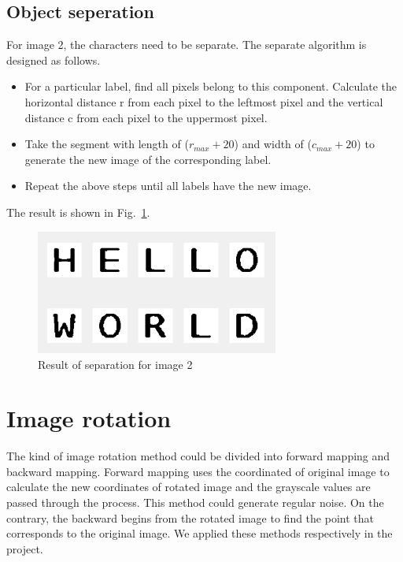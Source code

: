 \documentclass[hyperref]{article}
\theoremstyle{nonumberplain}
\begin{document}
	\subsection{Object seperation}
	
	\hspace{1.0em}
	For image 2, the characters need to be separate. The separate algorithm is designed as follows.
	
	\begin{itemize}
		\item[Step 1. ] For a particular label, find all pixels belong to this component. Calculate the horizontal distance r from each pixel to the leftmost pixel and the vertical distance c from each pixel to the uppermost pixel.
		\item[Step 2. ] Take the segment with length of ($r_{max}+20$) and width of ($c_{max}+20$) to generate the new image of the corresponding label.
		\item[Step 3. ] Repeat the above steps until all labels have the new image.
	\end{itemize}

	The result is shown in Fig.~\ref{fig19}.
	
		\begin{figure}[htbp]
		\centering
		\includegraphics[width=8cm]{result seperate.png}
		\caption{Result of separation for image 2}
		\label{fig19}
	\end{figure}
	
	
	\section{Image rotation}
	
	\hspace{1.0em}
	The kind of image rotation method could be divided into forward mapping and backward mapping. Forward mapping uses the coordinated of original image to calculate the new coordinates of rotated image and the grayscale values are passed through the process. This method could generate regular noise. On the contrary, the backward begins from the rotated image to find the point that corresponds to the original image. We applied these methods respectively in the project.
	
\end{document}
